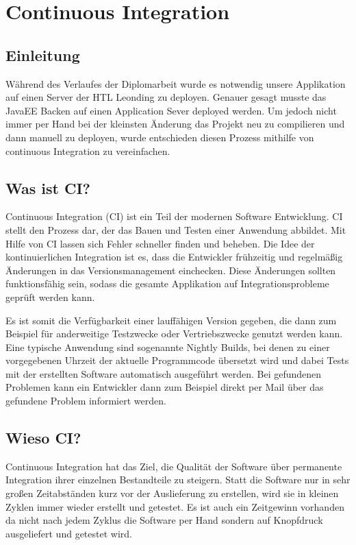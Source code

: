 \chapter{Continuous Integration}
\section{Einleitung}\label{sec:einleitung}
Während des Verlaufes der Diplomarbeit wurde es notwendig unsere Applikation auf einen Server der HTL Leonding zu deployen. Genauer gesagt musste das JavaEE Backen auf einen Application Sever deployed werden. Um jedoch nicht immer per Hand bei der kleinsten Änderung das Projekt neu zu compilieren und dann manuell zu deployen, wurde entschieden diesen Prozess mithilfe von continuous Integration zu vereinfachen.

\section{Was ist CI?}\label{sec:cierklärung}
Continuous Integration (CI) ist ein Teil der modernen Software Entwicklung. CI stellt den Prozess dar, der das Bauen und Testen einer Anwendung abbildet. Mit Hilfe von CI lassen sich Fehler schneller finden und beheben. Die Idee der kontinuierlichen Integration ist es, dass die Entwickler frühzeitig und regelmäßig Änderungen in das Versionsmanagement einchecken. Diese Änderungen sollten funktionsfähig sein, sodass die gesamte Applikation auf Integrationsprobleme geprüft werden kann.

Es ist somit die Verfügbarkeit einer lauffähigen Version gegeben, die dann zum Beispiel für anderweitige Testzwecke oder Vertriebszwecke genutzt werden kann. Eine typische Anwendung sind sogenannte Nightly Builds, bei denen zu einer vorgegebenen Uhrzeit der aktuelle Programmcode übersetzt wird und dabei Tests mit der erstellten Software automatisch ausgeführt werden. Bei gefundenen Problemen kann ein Entwickler dann zum Beispiel direkt per Mail über das gefundene Problem informiert werden.

\section{Wieso CI?}\label{sec:whyci}
Continuous Integration hat das Ziel, die Qualität der Software über permanente Integration ihrer einzelnen Bestandteile zu steigern. Statt die Software nur in sehr großen Zeitabständen kurz vor der Auslieferung zu erstellen, wird sie in kleinen Zyklen immer wieder erstellt und getestet. Es ist auch ein Zeitgewinn vorhanden da nicht nach jedem Zyklus die Software per Hand sondern auf Knopfdruck ausgeliefert und getestet wird.

